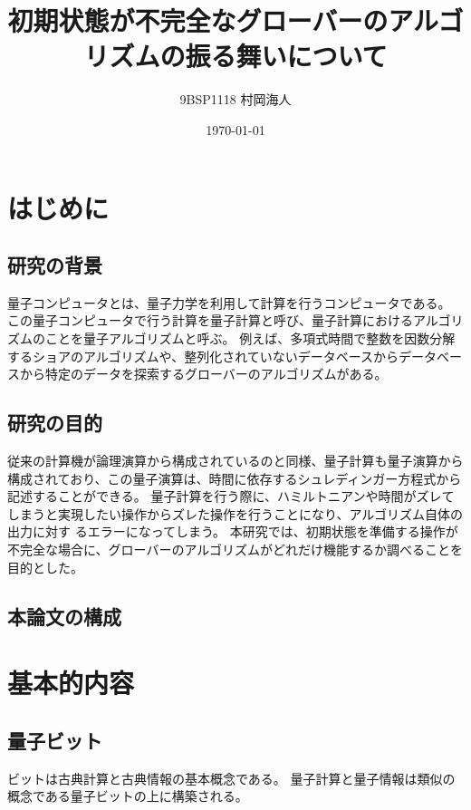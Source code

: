 \documentclass[platex,dvipdfmx, titlepage]{jlreq}			%
\title{初期状態が不完全なグローバーのアルゴリズムの振る舞いについて}
\author{9BSP1118 村岡海人}
\date{\today}
\begin{document}
\maketitle
\tableofcontents
\clearpage

\makeatletter
\renewcommand{\theequation}{%
\thesection.\arabic{equation}}
\makeatother

\section{はじめに}
\subsection{研究の背景}
量子コンピュータとは、量子力学を利用して計算を行うコンピュータである。
この量子コンピュータで行う計算を量子計算と呼び、量子計算におけるアルゴリズムのことを量子アルゴリズムと呼ぶ。
例えば、多項式時間で整数を因数分解するショアのアルゴリズムや、整列化されていないデータベースからデータベースから特定のデータを探索するグローバーのアルゴリズムがある。


\subsection{研究の目的}
従来の計算機が論理演算から構成されているのと同様、量子計算も量子演算から構成されており、この量子演算は、時間に依存するシュレディンガー方程式から記述することができる。
量子計算を行う際に、ハミルトニアンや時間がズレてしまうと実現したい操作からズレた操作を行うことになり、アルゴリズム自体の出力に対す るエラーになってしまう。
本研究では、初期状態を準備する操作が不完全な場合に、グローバーのアルゴリズムがどれだけ機能するか調べることを目的とした。
\subsection{本論文の構成}
\section{基本的内容}
\subsection{量子ビット}
ビットは古典計算と古典情報の基本概念である。
量子計算と量子情報は類似の概念である量子ビットの上に構築される。
\end{document}
